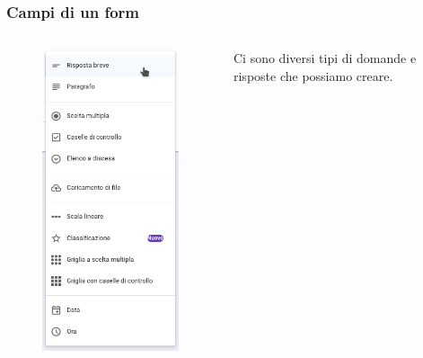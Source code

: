 \documentclass[handout]{beamer}
\begin{document}
\begin{frame}
\frametitle{Campi di un form}
\begin{columns}
  \begin{column}{.3\textwidth}
    \begin{figure}
      \includegraphics[width=\columnwidth]{img/form3.png}
    \end{figure}
  \end{column}
  \begin{column}{.65\textwidth}
    Ci sono diversi tipi di domande e risposte che possiamo creare.\pause


\end{column}
\end{columns}
\end{frame}
\end{document}
